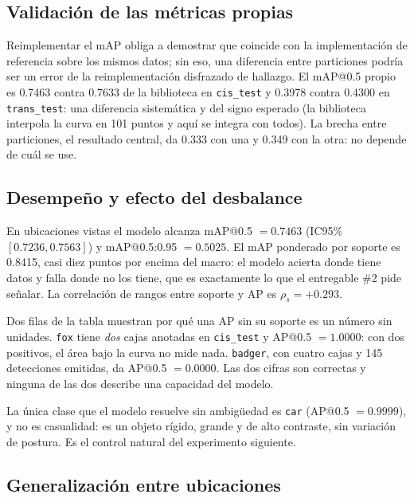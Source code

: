 \subsection{Validación de las métricas propias}

Reimplementar el mAP obliga a demostrar que coincide con la implementación de
referencia sobre los mismos datos; sin eso, una diferencia entre particiones
podría ser un error de la reimplementación disfrazado de hallazgo. El mAP@0.5
propio es 0.7463 contra 0.7633 de la biblioteca en \texttt{cis\_test} y 0.3978
contra 0.4300 en \texttt{trans\_test}: una diferencia sistemática y del signo
esperado (la biblioteca interpola la curva en 101 puntos y aquí se integra con
todos). La brecha entre particiones, el resultado central, da 0.333 con una y
0.349 con la otra: no depende de cuál se use.

\subsection{Desempeño y efecto del desbalance}




En ubicaciones vistas el modelo alcanza mAP@0.5 $= 0.7463$ (IC95\%
$[0.7236, 0.7563]$) y mAP@0.5:0.95 $= 0.5025$. El mAP ponderado por soporte es
0.8415, casi diez puntos por encima del macro: el modelo acierta donde tiene
datos y falla donde no los tiene, que es exactamente lo que el entregable \#2
pide señalar. La correlación de rangos entre soporte y AP es $\rho_s = +0.293$.

Dos filas de la tabla muestran por qué una AP sin su soporte es un número sin
unidades. \texttt{fox} tiene \emph{dos} cajas anotadas en \texttt{cis\_test} y
AP@0.5 $= 1.0000$: con dos positivos, el área bajo la curva no mide nada.
\texttt{badger}, con cuatro cajas y 145 detecciones emitidas, da AP@0.5
$= 0.0000$. Las dos cifras son correctas y ninguna de las dos describe una
capacidad del modelo.

La única clase que el modelo resuelve sin ambigüedad es \texttt{car} (AP@0.5
$= 0.9999$), y no es casualidad: es un objeto rígido, grande y de alto
contraste, sin variación de postura. Es el control natural del experimento
siguiente.

\subsection{Generalización entre ubicaciones}
\label{sec:generalizacion}

